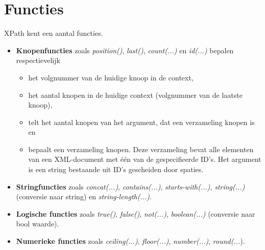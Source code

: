 \documentclass{report}
\begin{document}
	\section{Functies}
	XPath kent een aantal functies.
	\begin{itemize}
		\item \textbf{Knopenfuncties} zoals \textit{position()}, \textit{last()}, \textit{count(...)} en \textit{id(...)} bepalen respectievelijk \begin{itemize}
			\item het volgnummer van de huidige knoop in de context, 
			\item het aantal knopen in de huidige context (volgnummer van de laatste knoop),
			\item telt het aantal knopen van het argument, dat een verzameling knopen is en
			\item bepaalt een verzameling knopen. Deze verzameling bevat alle elementen van een XML-document met één van de gespecifieerde ID's. Het argument is een string bestaande uit ID's gescheiden door spaties.
		\end{itemize}
	
		\item \textbf{Stringfuncties} zoals \textit{concat(...)}, \textit{contains(...)}, \textit{starts-with(...)}, \textit{string(...)} (conversie naar string) en \textit{string-length(...)}.
		
		\item \textbf{Logische functies} zoals \textit{true()}, \textit{false()}, \textit{not(...)}, \textit{boolean(...)} (conversie naar bool waarde).
		
		\item \textbf{Numerieke functies} zoals \textit{ceiling(...)}, \textit{floor(...)}, \textit{number(...)}, \textit{round(...}).
	\end{itemize}
\end{document}
